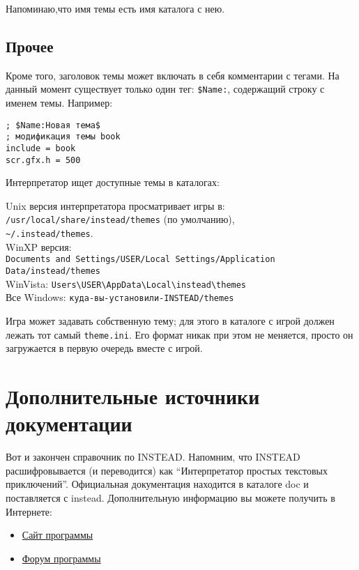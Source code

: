 \documentclass[a4paper,12pt]{article}
\begin{document}
Напоминаю,что имя темы есть имя каталога с нею.

\subsection{Прочее}

Кроме того, заголовок темы может включать в себя комментарии с тегами. На данный момент существует только один тег: \verb/$Name:/, содержащий строку с именем темы. Например:

\begin{verbatim}
; $Name:Новая тема$
; модификация темы book
include = book
scr.gfx.h = 500
\end{verbatim}

Интерпретатор ищет доступные темы в каталогах:

Unix версия интерпретатора просматривает игры в:\\
\verb;/usr/local/share/instead/themes; (по умолчанию),\\
\verb,~/.instead/themes,.\\
WinXP версия:\\
\verb;Documents and Settings/USER/Local Settings/Application Data/instead/themes;\\
WinVista: \verb;Users\USER\AppData\Local\instead\themes;\\
Все Windows: \verb;куда-вы-установили-INSTEAD/themes;


Игра может задавать собственную тему; для этого в каталоге с игрой должен лежать тот самый \verb/theme.ini/. Его формат никак при этом не меняется, просто он загружается в первую очередь вместе с игрой.

\section{Дополнительные источники документации}
Вот и закончен справочник по INSTEAD. Напомним, что INSTEAD расшифровывается (и переводится) как ``Интерпретатор простых текстовых приключений''. Официальная документация находится в каталоге doc и поставляется с instead. Дополнительную информацию вы можете получить в Интернете:

\begin{itemize}
\item \href{http://instead.googlecode.com/}{Сайт программы}
\item \href{http://instead.pinebrush.com/}{Форум программы}
\end{itemize}
\end{document}
